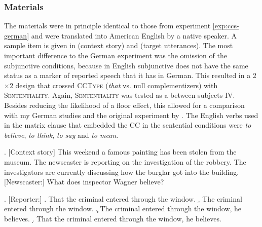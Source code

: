 \subsubsection{Materials}\label{sec:ccs-english-materials}
The materials were in principle identical to those from experiment \ref{exp:ccs-german} and were translated into American English by a native speaker. A sample item is given in \Next (context story) and \NNext (target utterances). The most important difference to the German experiment was the omission of the subjunctive conditions, because in English subjunctive does not have the same status as a marker of reported speech that it has in German. This resulted in a 2$\times$2 design that crossed \textsc{CCType} (\textit{that} vs. null complementizers) with \textsc{Sententiality}. Again, \textsc{Sententiality} was tested as a between subjects IV. Besides reducing the likelihood of a floor effect, this allowed for a comparison with my German studies and the original experiment by \citet{merchant.etal2013}. The English verbs used in the matrix clause that embedded the CC in the sentential conditions were \textit{to believe}, \textit{to think}, \textit{to say} and \textit{to mean}.

\ex. [Context story] This weekend a famous painting has been stolen from the museum. The newscaster is reporting on the investigation of the robbery. The investigators are currently discussing how the burglar got into the building.\\\mbox{}[Newscaster:] What does inspector Wagner believe?


\ex. [Reporter:]
\a. That the criminal entered through the window.
\b. The criminal entered through the window.
\c. The criminal entered through the window, he believes.
\d. That the criminal entered through the window, he believes.

